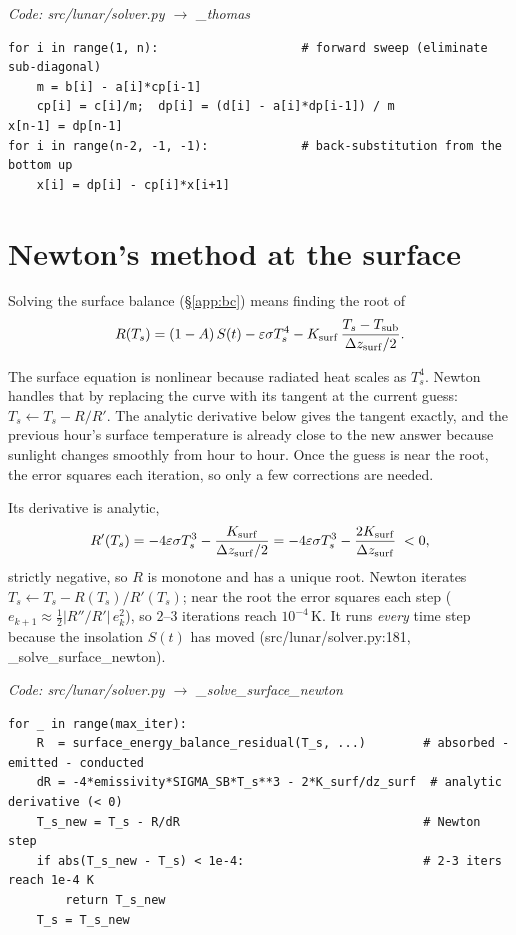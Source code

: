 \documentclass[11pt]{report}
\newcommand{\code}[1]{{\ttfamily\small #1}}
\begin{document}
{\small\color{dim}\textit{Code: \code{src/lunar/solver.py} $\to$ \code{\_thomas}}}
\begin{lstlisting}[style=py]
for i in range(1, n):                    # forward sweep (eliminate sub-diagonal)
    m = b[i] - a[i]*cp[i-1]
    cp[i] = c[i]/m;  dp[i] = (d[i] - a[i]*dp[i-1]) / m
x[n-1] = dp[n-1]
for i in range(n-2, -1, -1):             # back-substitution from the bottom up
    x[i] = dp[i] - cp[i]*x[i+1]
\end{lstlisting}

\section{Newton's method at the surface}\label{app:newton}
Solving the surface balance (\S\ref{app:bc}) means finding the root of
\[
R(T_s)=(1-A)\,S(t)-\varepsilon\sigma T_s^4
-K_{\rm surf}\,\frac{T_s-T_{\rm sub}}{\Delta z_{\rm surf}/2}.
\]

\begin{plain}
The surface equation is nonlinear because radiated heat scales as $T_s^4$. Newton
handles that by replacing the curve with its tangent at the current guess:
$T_s\leftarrow T_s-R/R'$. The analytic derivative below gives the tangent
exactly, and the previous hour's surface temperature is already close to the new
answer because sunlight changes smoothly from hour to hour. Once the guess is
near the root, the error squares each iteration, so only a few corrections are
needed.
\end{plain}

Its derivative is analytic,
\[
R'(T_s)=-4\varepsilon\sigma T_s^3-\frac{K_{\rm surf}}{\Delta z_{\rm surf}/2}
=-4\varepsilon\sigma T_s^3-\frac{2K_{\rm surf}}{\Delta z_{\rm surf}}\;<0,
\]
strictly negative, so $R$ is monotone and has a unique root. Newton iterates
$T_s\leftarrow T_s-R(T_s)/R'(T_s)$; near the root the error squares each step
($e_{k+1}\approx\tfrac12|R''/R'|\,e_k^2$), so $2$--$3$ iterations reach
$10^{-4}$\,K. It runs \emph{every} time step because the insolation $S(t)$ has
moved (\code{src/lunar/solver.py:181}, \code{\_solve\_surface\_newton}).

{\small\color{dim}\textit{Code: \code{src/lunar/solver.py} $\to$ \code{\_solve\_surface\_newton}}}
\begin{lstlisting}[style=py]
for _ in range(max_iter):
    R  = surface_energy_balance_residual(T_s, ...)        # absorbed - emitted - conducted
    dR = -4*emissivity*SIGMA_SB*T_s**3 - 2*K_surf/dz_surf  # analytic derivative (< 0)
    T_s_new = T_s - R/dR                                  # Newton step
    if abs(T_s_new - T_s) < 1e-4:                         # 2-3 iters reach 1e-4 K
        return T_s_new
    T_s = T_s_new
\end{lstlisting}
\end{document}
